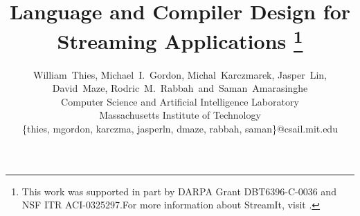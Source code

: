 \documentclass[10pt]{article}
\begin{document}
\title{Language and Compiler Design for Streaming Applications%
\thanks{This work was supported in  part by DARPA Grant DBT6396-C-0036 and NSF
ITR ACI-0325297.\newline For more information about StreamIt, visit \streamiturl.}}

\author{William~Thies, Michael~I.~Gordon, Michal~Karczmarek, Jasper~Lin,\\ 
 David~Maze, Rodric~M.~Rabbah~and~Saman~Amarasinghe\\
 Computer Science and Artificial Intelligence Laboratory\\
 Massachusetts Institute of Technology\\
 \{thies, mgordon, karczma, jasperln, dmaze, rabbah, saman\}@csail.mit.edu}

\maketitle
\thispagestyle{empty}


\begin{abstract}

\end{abstract}
\end{document}
